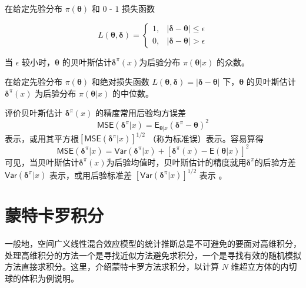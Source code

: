 \documentclass[12pt,a4paper,UTF8,twoside]{book}
\theoremstyle{definition}
\theoremstyle{definition}
\theoremstyle{definition}
\theoremstyle{remark}
\let\BeginKnitrBlock\begin \let\EndKnitrBlock\end
\begin{document}
\BeginKnitrBlock{theorem}[0 - 1 损失]
\protect\hypertarget{thm:bayes-estimate-01}{}{\label{thm:bayes-estimate-01}
{} }在给定先验分布 \(\pi(\boldsymbol{\theta})\)
和 \(0\) - \(1\) 损失函数

\begin{equation*}
L(\boldsymbol{\theta},\boldsymbol{\delta}) = 
\begin{cases}
1, & | \boldsymbol{\delta} - \boldsymbol{\theta}| \leq \epsilon \\
0, & | \boldsymbol{\delta} - \boldsymbol{\theta}| > \epsilon
\end{cases}
\end{equation*}

当 \(\epsilon\) 较小时，\(\boldsymbol{\theta}\)
的贝叶斯估计\(\boldsymbol{\delta}^{\pi}(x)\)为后验分布
\(\pi(\boldsymbol{\theta}|x)\) 的众数。
\EndKnitrBlock{theorem}

\BeginKnitrBlock{theorem}[绝对值损失]
\protect\hypertarget{thm:bayes-estimate-abs}{}{\label{thm:bayes-estimate-abs}
{} }在给定先验分布 \(\pi(\boldsymbol{\theta})\)
和绝对损失函数
\(L(\boldsymbol{\theta},\boldsymbol{\delta}) = |\boldsymbol{\delta} - \boldsymbol{\theta}|\)
下，\(\boldsymbol{\theta}\) 的贝叶斯估计
\(\boldsymbol{\delta}^{\pi}(x)\) 为后验分布
\(\pi(\boldsymbol{\theta}|x)\) 的中位数。
\EndKnitrBlock{theorem}

评价贝叶斯估计 \(\boldsymbol{\delta}^{\pi}(x)\) 的精度常用后验均方误差
\[\mathsf{MSE}(\boldsymbol{\delta}^{\pi}|x) = \mathsf{E}_{\boldsymbol{\theta}|x}(\boldsymbol{\delta}^{\pi} - \boldsymbol{\theta})^2\]
表示，或用其平方根\([\mathsf{MSE}(\boldsymbol{\delta}^{\pi}|x)]^{1/2}\)
（称为标准误）表示。容易算得
\[\mathsf{MSE}(\boldsymbol{\delta}^{\pi}|x) = \mathsf{Var}(\boldsymbol{\delta}^{\pi}|x) + [\boldsymbol{\delta}^{\pi}(x) - \mathsf{E}(\boldsymbol{\theta}|x)]^2\]
可见，当贝叶斯估计\(\boldsymbol{\delta}^{\pi}(x)\)为后验均值时，贝叶斯估计的精度就用\(\boldsymbol{\delta}^{\pi}\)的后验方差\(\mathsf{Var}(\boldsymbol{\delta}^{\pi}|x)\)
表示，或用后验标准差
\([\mathsf{Var}(\boldsymbol{\delta}^{\pi}|x)]^{1/2}\) 表示
\citep{mao2006}。

\hypertarget{Curse-of-Dimensionality}{%
\section{蒙特卡罗积分}\label{Curse-of-Dimensionality}}

一般地，空间广义线性混合效应模型的统计推断总是不可避免的要面对高维积分，处理高维积分的方法一个是寻找近似方法避免求积分，一个是寻找有效的随机模拟方法直接求积分。这里，介绍蒙特卡罗方法求积分，以计算
\(N\) 维超立方体的内切球的体积为例说明。
\end{document}
